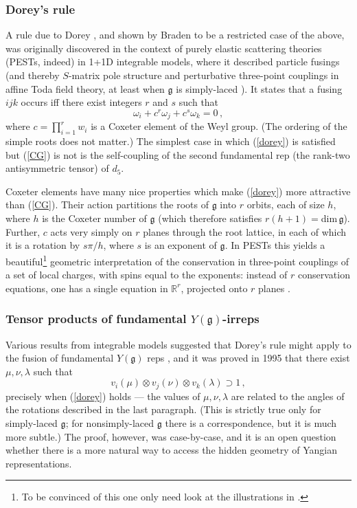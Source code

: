 \documentclass[12pt]{article}
\newcommand{\gf}{\mathfrak{g}}
\begin{document}
\subsubsection{Dorey's rule}\label{Dorey's rule}

A rule due to Dorey \cite{dorey}, and shown by Braden
\cite{braden} to be a restricted case of the above, was originally
discovered in the context of purely elastic scattering theories
(PESTs, indeed) in 1+1D integrable models, where it described
particle fusings (and thereby $S$-matrix pole structure and
perturbative three-point couplings in affine Toda field theory, at
least when $\gf$ is simply-laced \cite{BCDS}). It states that a
fusing $ijk$ occurs iff there exist integers $r$ and $s$ such that
\begin{equation} \omega_i + c^r \omega_j + c^s \omega_k=0\,,\label{dorey}\end{equation}
where $c=\prod_{i=1}^rw_i$ is a Coxeter element of the Weyl group.
(The ordering of the simple roots does not matter.) The simplest
case in which (\ref{dorey}) is satisfied but (\ref{CG}) is not is
the self-coupling of the second fundamental rep (the rank-two
antisymmetric tensor) of $d_5$.

Coxeter elements have many nice properties which make
(\ref{dorey}) more attractive than (\ref{CG}). Their action
partitions the roots of $\gf$ into $r$ orbits, each of size $h$,
where $h$ is the Coxeter number of $\gf$ (which therefore satisfies
$r(h+1)=$dim$\,\gf$). Further, $c$ acts very simply on $r$ planes
through the root lattice, in each of which it is a rotation by
$s\pi/h$, where $s$ is an exponent of $\gf$. In PESTs this yields a
beautiful\footnote{To be convinced of this one only need look at
the illustrations in \cite{coxeter}.} geometric interpretation of
the conservation in three-point couplings of a set of local
charges, with spins equal to the exponents: instead of $r$
conservation equations, one has a single equation in ${\mathbb
R}^r$, projected onto $r$ planes \cite{dorey}.

\subsubsection{Tensor products of fundamental $Y(\gf)$-irreps}

Various results from integrable models suggested that Dorey's rule
might apply to the fusion of fundamental $Y(\gf)$ reps
\cite{nankai}, and it was proved in 1995 \cite{chari95} that there
exist $\mu,\nu,\lambda$ such that \begin{equation} v_i(\mu)\otimes v_j(\nu)
\otimes v_k(\lambda) \supset 1\,,\label{CGY}\end{equation} precisely when
(\ref{dorey}) holds --- the values of  $\mu,\nu,\lambda$ are
related to the angles of the rotations described in the last
paragraph. (This is strictly true only for simply-laced $\gf$; for
nonsimply-laced $\gf$ there is a correspondence, but it is much
more subtle.) The proof, however, was case-by-case, and it is an
open question whether there is a more natural way to access the
hidden geometry of Yangian representations.
\end{document}
